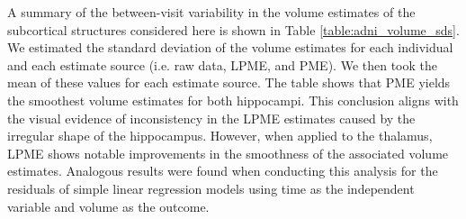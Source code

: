\documentclass[11pt,reqno]{article}
\newcommand{\zielinski}[1]{{\color{blue} \sf $\spadesuit\spadesuit\spadesuit$ Rob Zielinski: [#1]}}
\theoremstyle{definition}
\begin{document}
A summary of the between-visit variability in the volume estimates of the subcortical structures considered here is shown in Table \ref{table:adni_volume_sds}. We estimated the standard deviation of the volume estimates for each individual and each estimate source (i.e. raw data, LPME, and PME). We then took the mean of these values for each estimate source. The table shows that PME yields the smoothest volume estimates for both hippocampi. This conclusion aligns with the visual evidence of inconsistency in the LPME estimates caused by the irregular shape of the hippocampus. However, when applied to the thalamus, LPME shows notable improvements in the smoothness of the associated volume estimates. Analogous results were found when conducting this analysis for the residuals of simple linear regression models using time as the independent variable and volume as the outcome.


\end{document}
